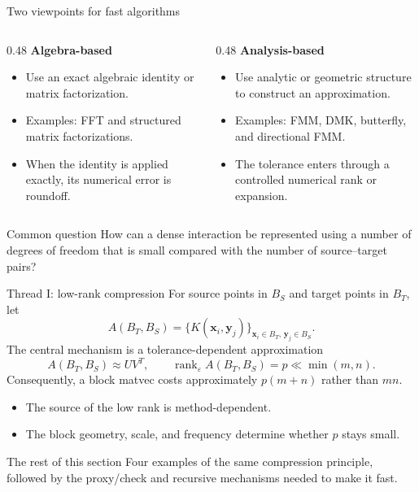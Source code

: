\documentclass[aspectratio=169,11pt]{beamer}
\newcommand{\x}{\bm{x}}
\newcommand{\y}{\bm{y}}
\newcommand{\eps}{\varepsilon}
\DeclareMathOperator{\rank}{rank}
\begin{document}
\begin{frame}{Two viewpoints for fast algorithms}
\small
\begin{columns}[T,totalwidth=\textwidth]
\begin{column}{0.48\textwidth}
\textbf{Algebra-based}
\begin{itemize}\itemsep2pt
  \item Use an exact algebraic identity or matrix factorization.
  \item Examples: FFT and structured matrix factorizations.
  \item When the identity is applied exactly, its numerical error is roundoff.
\end{itemize}
\end{column}
\begin{column}{0.48\textwidth}
\textbf{Analysis-based}
\begin{itemize}\itemsep2pt
  \item Use analytic or geometric structure to construct an approximation.
  \item Examples: FMM, DMK, butterfly, and directional FMM.
  \item The tolerance enters through a controlled numerical rank or expansion.
\end{itemize}
\end{column}
\end{columns}
\vspace{2mm}
\begin{block}{Common question}
How can a dense interaction be represented using a number of degrees of freedom
that is small compared with the number of source--target pairs?
\end{block}
\end{frame}

\begin{frame}{Thread I: low-rank compression}
\small
For source points in $B_S$ and target points in $B_T$, let
\[
  A(B_T,B_S)=\{K(\x_i,\y_j)\}_{\x_i\in B_T,\,\y_j\in B_S}.
\]
The central mechanism is a tolerance-dependent approximation
\[
  A(B_T,B_S)\approx U V^T,\qquad \rank_\eps A(B_T,B_S)=p\ll\min(m,n).
\]
Consequently, a block matvec costs approximately $p(m+n)$ rather than $mn$.

\begin{itemize}
  \item The source of the low rank is method-dependent.
  \item The block geometry, scale, and frequency determine whether $p$ stays
  small.
\end{itemize}
\begin{block}{The rest of this section}
Four examples of the same compression principle, followed by the proxy/check
and recursive mechanisms needed to make it fast.
\end{block}
\end{frame}
\end{document}
